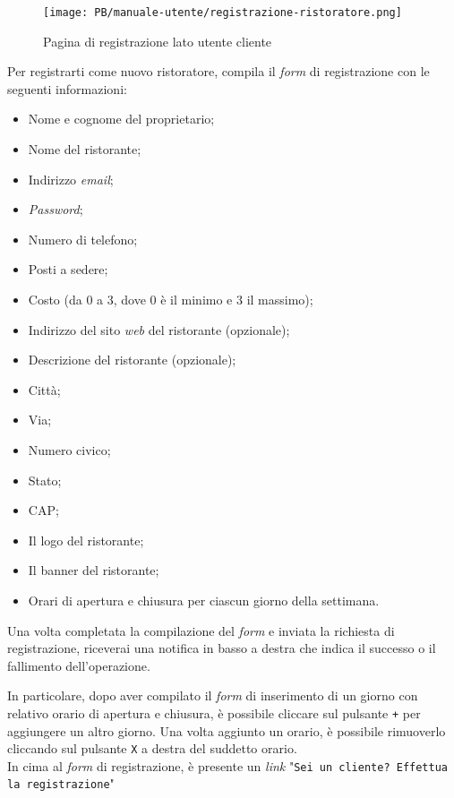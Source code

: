 \begin{figure}[htbp]
    \centering
	\texttt{[image: PB/manuale-utente/registrazione-ristoratore.png]}
    \caption{Pagina di registrazione lato utente cliente}
\end{figure}

Per registrarti come nuovo ristoratore, compila il \textit{form} di registrazione con le
seguenti informazioni:
\begin{itemize}
	\item Nome e cognome del proprietario;
	\item Nome del ristorante;
	\item Indirizzo \textit{email};
	\item \textit{Password};
	\item Numero di telefono;
	\item Posti a sedere;
	\item Costo (da 0 a 3, dove 0 è il minimo e 3 il massimo);
	\item Indirizzo del sito \textit{web} del ristorante (opzionale);
	\item Descrizione del ristorante (opzionale);
	\item Città;
	\item Via;
	\item Numero civico;
	\item Stato;
	\item CAP;
	\item Il logo del ristorante;
	\item Il banner del ristorante;
	\item Orari di apertura e chiusura per ciascun giorno della settimana.
\end{itemize}

Una volta completata la compilazione del \textit{form} e inviata la richiesta di registrazione, riceverai 
una notifica in basso a destra che indica il successo o il fallimento
dell'operazione.

In particolare, dopo aver compilato il \textit{form} di inserimento di un giorno con
relativo orario di apertura e chiusura, è possibile cliccare sul pulsante
\texttt{+} per aggiungere un altro giorno. Una volta aggiunto un orario, è
possibile rimuoverlo cliccando sul pulsante \texttt{X} a destra del suddetto
orario.\\
In cima al \textit{form} di registrazione, è presente un \textit{link} "\texttt{Sei un cliente? Effettua la registrazione}"

